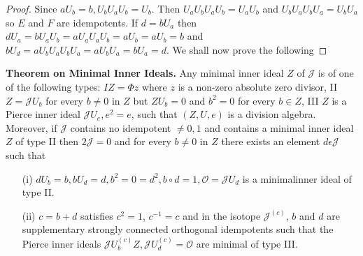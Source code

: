 \begin{proof}
Since $aU_b=b,U_bU_aU_b=U_b$. Then $U_aU_bU_aU_b=U_aU_b$ and
$U_bU_aU_bU_a=U_bU_a$ so $E$ and $F$ are idempotents. If $d=bU_a$ then
$dU_a=bU_aU_b=aU_a U_aU_b=aU_b=aU_b=b$ and
$bU_d=aU_bU_aU_bU_a=aU_bU_a=bU_a=d$.
We shall now prove the following
\end{proof}
\noindent
{\textbf{Theorem on Minimal Inner Ideals.}}
Any minimal inner ideal $Z$ of $\mathscr{J}$ is of one of
the following types: $IZ=\Phi z$ where $z$ is a non-zero
absolute zero divisor, II $Z=\mathscr{J}U_b$ for every
$b\neq 0$ in $Z$ but $Z U_b=0$ and $b^{2}=0$ for
every $b\in Z$, III $Z$ is a Pierce inner ideal $\mathscr{J}
U_e,e^{2}=e$, such that $(Z,U,e)$ is  a division
algebra. Moreover, if $\mathscr{J}$ contains no idempotent $\neq 0,1$
and contains a minimal inner ideal $Z$ of type II then
$2\mathscr{J}=0$ and for every $b\neq 0$ in $Z$ there
exists an element $d\epsilon \mathscr{J}$ such that
\begin{itemize}
\item[(i)] $dU_b=b, bU_d=d, b^{2}=0=d^{2}, b\circ d=1,
  \mathscr{O}=\mathscr{J}U_d$ is a minimal\pageoriginale inner ideal of type II.

\item[(ii)] $c=b+d$ satisfies $c^{2}=1$, $c^{-1}=c$ and in the isotope
  $\mathscr{J}^{(c)}$, $b$ and $d$ are supplementary strongly
  connected orthogonal idempotents such that the Pierce inner ideals
  $\mathscr{J}U_b^{(c)}Z, \mathscr{J} U_d^{(c)}= \mathscr{O}$ are
  minimal of type III. 
\end{itemize}

